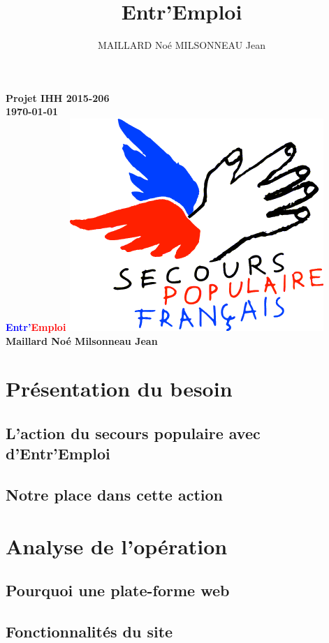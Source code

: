 \documentclass{report}
\title{Entr'Emploi}
\author{MAILLARD Noé MILSONNEAU Jean}
\begin{document}
\begin{titlepage}
    \centering
    \vfill
    {\bfseries\Large
        Projet IHH 2015-206\\
        \today\\
        \vskip2cm
        \Huge
        \textcolor{blue}{Entr'}\textcolor{red}{Emploi}
        \Large
        \includegraphics{../../public/images/Logo-spf.png}
        \vskip2cm
        Maillard Noé Milsonneau Jean\\
    }    
    \vfill
    \vfill
    \vfill
    \normalsize
\end{titlepage}

\tableofcontents

 
\chapter{Présentation du besoin}
\section{L'action du secours populaire avec d'Entr'Emploi}
\section{Notre place dans cette action}

\chapter{Analyse de l’opération}
\section{Pourquoi une plate-forme web}
\section{Fonctionnalités du site}
\end{document}

